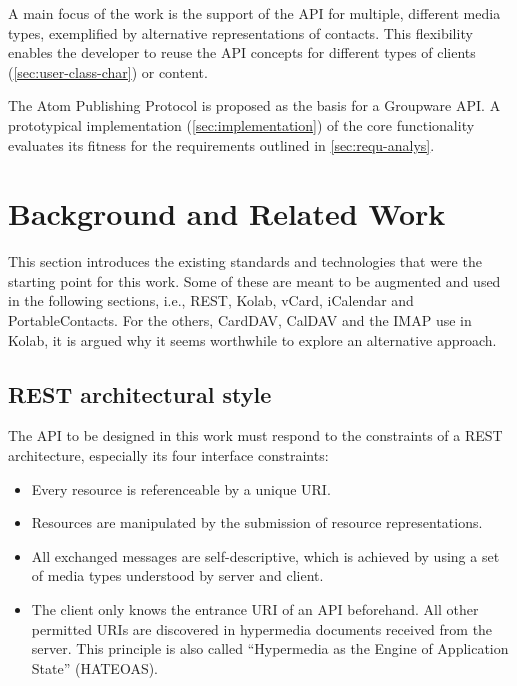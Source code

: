 \documentclass[11pt,a4paper,headsepline,twoside]{scrartcl}		%
\newcommand{\citeurl}[2]{\url{#1} (#2)}
\begin{document}
A main focus of the work is the support of the API for multiple, different
media types, exemplified by alternative representations of contacts. This
flexibility enables the developer to reuse the API concepts for different types
of clients (\autoref{sec:user-class-char}) or content.

The Atom Publishing Protocol is proposed as the basis for a Groupware API. A
prototypical implementation (\autoref{sec:implementation}) of the core
functionality evaluates its fitness for the requirements outlined in
\autoref{sec:requ-analys}.


\section{Background and Related Work}
\label{sec:backgr-relat-work}

This section introduces the existing standards and technologies that were the
starting point for this work. Some of these are meant to be augmented and used
in the following sections, i.e., REST, Kolab, vCard, iCalendar and
PortableContacts. For the others, CardDAV, CalDAV and the IMAP use in Kolab, it
is argued why it seems worthwhile to explore an alternative approach.

\subsection{REST architectural style}

The API to be designed in this work must respond to the constraints of a REST
architecture, especially its four interface
constraints\cite[sec. 5.1.5]{Fielding2000}:

\begin{itemize}
\item Every resource is referenceable by a unique URI.
\item Resources are manipulated by the submission of resource representations.
\item All exchanged messages are self-descriptive, which is achieved by using a
  set of media types understood by server and client.
\item The client only knows the entrance URI of an API beforehand. All other
  permitted URIs are discovered in hypermedia documents received from the
  server. This principle is also called ``Hypermedia as the Engine of
  Application State'' (HATEOAS).
\end{itemize}
\end{document}
